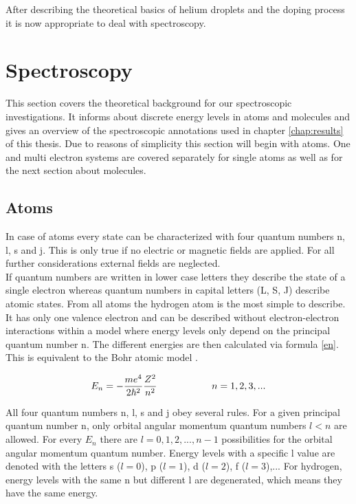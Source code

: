 \documentclass[parskip,12pt,headsepline,a4paper] {scrbook}
\begin{document}
After describing the theoretical basics of helium droplets and the doping process it is now appropriate to deal with spectroscopy.

\section{Spectroscopy}
\vspace{-0.5\baselineskip}
This section covers the theoretical background for our spectroscopic investigations. It informs about discrete energy levels in atoms and molecules and gives an overview of the spectroscopic annotations used in chapter \ref{chap:results} of this thesis. Due to reasons of simplicity this section will begin with atoms. One and multi electron systems are covered separately for single atoms as well as for the next section about molecules.

\subsection{Atoms}
\vspace{-1\baselineskip}
In case of atoms every state can be characterized with four quantum numbers n, l, s and j. This is only true if no electric or magnetic fields are applied. For all further considerations external fields are neglected. \\
If quantum numbers are written in lower case letters they describe the state of a single electron whereas quantum numbers in capital letters (L, S, J) describe atomic states.
From all atoms the hydrogen atom is the most simple to describe. It has only one valence electron and can be described without electron-electron interactions within a model where energy levels only depend on the principal quantum number n. The different energies are then calculated via formula \ref{en}. This is equivalent to the Bohr atomic model \cite{vdl}.

\begin{align}  \label{en}
E_n = - \frac{m e^4}{2 \hbar^2} \frac{Z^2}{n^2} \hspace{2 cm} n = 1,2,3,...
\end{align}

All four quantum numbers n, l, s and j obey several rules. For a given principal quantum number n, only orbital angular momentum quantum numbers $l < n$ are allowed. For every $E_n$ there are $l=0,1,2,...,n-1$ possibilities for the orbital angular momentum quantum number. Energy levels with a specific l value are denoted with the letters s ($l=0$), p ($l=1$), d ($l=2$), f ($l=3$),... For hydrogen, energy levels with the same n but different l are degenerated, which means they have the same energy.
\end{document}
